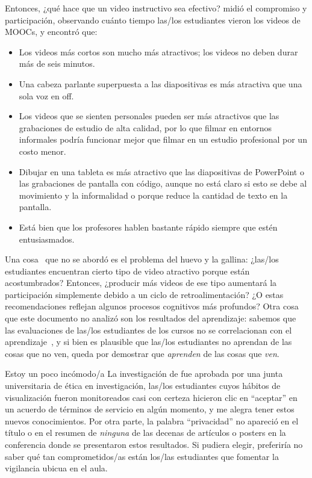 Entonces, ¿qué hace que un video instructivo sea efectivo?
\cite{Guo2014} midió el compromiso y participación, observando cuánto tiempo las/los estudiantes vieron los videos de MOOCs,
y encontró que:

\begin{itemize}

\item
  Los videos más cortos son mucho más atractivos; los videos no deben durar más de seis minutos.

\item
  Una cabeza parlante superpuesta a las diapositivas es más atractiva que una sola voz en off.

\item
  Los videos que se sienten personales pueden ser más atractivos que las grabaciones de estudio de alta calidad,
  por lo que filmar en entornos informales podría funcionar mejor que filmar en un estudio profesional por un costo menor.

\item
  Dibujar en una tableta es más atractivo que las diapositivas de PowerPoint o las grabaciones de pantalla con código,
  aunque no está claro si esto se debe al movimiento y la informalidad
  o porque reduce la cantidad de texto en la pantalla.

\item
  Está bien que los profesores hablen bastante rápido siempre que estén entusiasmados.

\end{itemize}

Una cosa~\cite{Guo2014} que no se abordó es el problema del huevo y la gallina:
¿las/los estudiantes encuentran cierto tipo de video atractivo porque están acostumbrados?
Entonces, ¿producir más videos de ese tipo aumentará la participación simplemente debido a un ciclo de retroalimentación?
¿O estas recomendaciones reflejan algunos procesos cognitivos más profundos?
Otra cosa que este documento no analizó son los resultados del aprendizaje:
sabemos que las evaluaciones de las/los estudiantes de los cursos no se correlacionan con el aprendizaje~\cite{Star2014,Uttl2017},
y si bien es plausible que las/los estudiantes no aprendan de las cosas que no ven,
queda por demostrar que \emph{aprenden} de las cosas que \emph{ven}.

\begin{aside}{Estoy un poco incómodo/a}
  La investigación de \cite{Guo2014} fue aprobada por una junta universitaria de ética en investigación,
  las/los estudiantes cuyos hábitos de visualización fueron monitoreados casi con certeza hicieron clic en ``aceptar''
  en un acuerdo de términos de servicio en algún momento,
  y me alegra tener estos nuevos conocimientos.
  Por otra parte,
  la palabra ``privacidad'' no apareció en el título o en el resumen
  de \emph{ninguna} de las decenas de artículos o posters en la conferencia donde se presentaron estos resultados.
  Si pudiera elegir,
  preferiría no saber qué tan comprometidos/as están los/las estudiantes
  que fomentar la vigilancia ubicua en el aula.
\end{aside}

